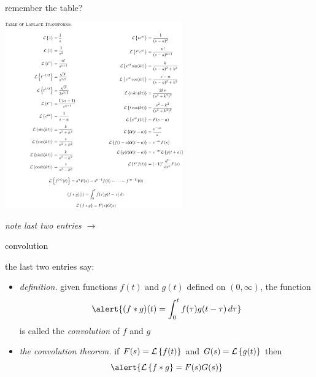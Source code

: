 \documentclass[urlcolor=blue,dvipsnames]{beamer}
\begin{document}
\begin{frame}{remember the table?}

\vspace{-5mm}
\begin{center}
\includegraphics[height=80mm]{figs/fulllaplacetable}
\end{center}

\vspace{-13mm}
\alert{\emph{note last two entries $\to$}}
\end{frame}


\begin{frame}{convolution}

the last two entries say:

\bigskip
\begin{itemize}
\item \emph{definition.}  given functions $f(t)$ and $g(t)$ defined on $(0,\infty)$, the function
    $$\alert{(f \ast g)(t) = \int_0^t f(\tau) g(t-\tau)\,d\tau}$$
is called the \alert{\emph{convolution}} of $f$ and $g$
\item \emph{the convolution theorem.}  if $F(s)=\mathcal{L}\left\{f(t)\right\}$ and $G(s)=\mathcal{L}\left\{g(t)\right\}$ then
    $$\alert{\LL{f \ast g} = F(s) G(s)}$$
\end{itemize}
\end{frame}
\end{document}
